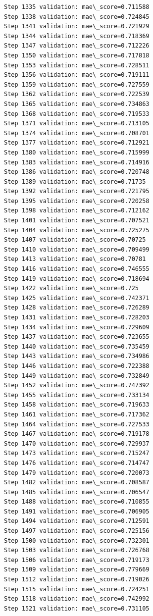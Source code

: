 \documentclass[11pt]{article}
\begin{document}
\begin{Verbatim}[commandchars=\\\{\}]
Step 1335 validation: mae\_score=0.711588
Step 1338 validation: mae\_score=0.724845
Step 1341 validation: mae\_score=0.721929
Step 1344 validation: mae\_score=0.718369
Step 1347 validation: mae\_score=0.712226
Step 1350 validation: mae\_score=0.717818
Step 1353 validation: mae\_score=0.728511
Step 1356 validation: mae\_score=0.719111
Step 1359 validation: mae\_score=0.727559
Step 1362 validation: mae\_score=0.722539
Step 1365 validation: mae\_score=0.734863
Step 1368 validation: mae\_score=0.719533
Step 1371 validation: mae\_score=0.713105
Step 1374 validation: mae\_score=0.708701
Step 1377 validation: mae\_score=0.712921
Step 1380 validation: mae\_score=0.715999
Step 1383 validation: mae\_score=0.714916
Step 1386 validation: mae\_score=0.720748
Step 1389 validation: mae\_score=0.71735
Step 1392 validation: mae\_score=0.721795
Step 1395 validation: mae\_score=0.720258
Step 1398 validation: mae\_score=0.712162
Step 1401 validation: mae\_score=0.707521
Step 1404 validation: mae\_score=0.725275
Step 1407 validation: mae\_score=0.70725
Step 1410 validation: mae\_score=0.709499
Step 1413 validation: mae\_score=0.70781
Step 1416 validation: mae\_score=0.746555
Step 1419 validation: mae\_score=0.718694
Step 1422 validation: mae\_score=0.725
Step 1425 validation: mae\_score=0.742371
Step 1428 validation: mae\_score=0.726289
Step 1431 validation: mae\_score=0.728203
Step 1434 validation: mae\_score=0.729609
Step 1437 validation: mae\_score=0.723655
Step 1440 validation: mae\_score=0.735459
Step 1443 validation: mae\_score=0.734986
Step 1446 validation: mae\_score=0.722388
Step 1449 validation: mae\_score=0.732849
Step 1452 validation: mae\_score=0.747392
Step 1455 validation: mae\_score=0.733134
Step 1458 validation: mae\_score=0.719633
Step 1461 validation: mae\_score=0.717362
Step 1464 validation: mae\_score=0.727533
Step 1467 validation: mae\_score=0.719178
Step 1470 validation: mae\_score=0.729937
Step 1473 validation: mae\_score=0.715247
Step 1476 validation: mae\_score=0.714747
Step 1479 validation: mae\_score=0.720073
Step 1482 validation: mae\_score=0.708587
Step 1485 validation: mae\_score=0.706547
Step 1488 validation: mae\_score=0.710855
Step 1491 validation: mae\_score=0.706905
Step 1494 validation: mae\_score=0.712591
Step 1497 validation: mae\_score=0.725156
Step 1500 validation: mae\_score=0.732301
Step 1503 validation: mae\_score=0.726768
Step 1506 validation: mae\_score=0.719173
Step 1509 validation: mae\_score=0.779669
Step 1512 validation: mae\_score=0.719026
Step 1515 validation: mae\_score=0.724251
Step 1518 validation: mae\_score=0.742992
Step 1521 validation: mae\_score=0.731105

\end{Verbatim}
\end{document}

